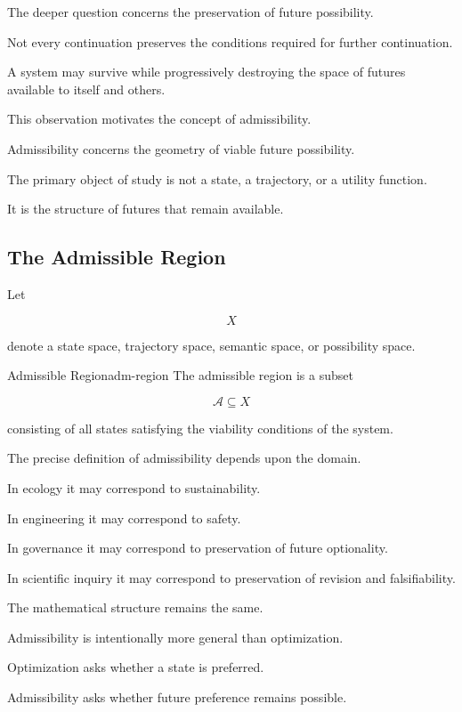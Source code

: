 \documentclass[12pt,twoside,openright]{book}
\newenvironment{rem}
{\begin{remark}{}{}}
{\end{remark}}
\begin{document}
The deeper question concerns the preservation of future
possibility.

Not every continuation preserves the conditions required
for further continuation.

A system may survive while progressively destroying the
space of futures available to itself and others.

This observation motivates the concept of admissibility.

Admissibility concerns the geometry of viable future
possibility.

The primary object of study is not a state, a trajectory,
or a utility function.

It is the structure of futures that remain available.

\subsection{The Admissible Region}

Let

\[
X
\]

denote a state space, trajectory space, semantic space,
or possibility space.

\begin{definition}{Admissible Region}{adm-region}
The admissible region is a subset

\[
\mathcal A
\subseteq
X
\]

consisting of all states satisfying the viability
conditions of the system.
\end{definition}

The precise definition of admissibility depends upon the
domain.

In ecology it may correspond to sustainability.

In engineering it may correspond to safety.

In governance it may correspond to preservation of future
optionality.

In scientific inquiry it may correspond to preservation
of revision and falsifiability.

The mathematical structure remains the same.

\begin{rem}
Admissibility is intentionally more general than
optimization.

Optimization asks whether a state is preferred.

Admissibility asks whether future preference remains
possible.
\end{rem}
\end{document}
